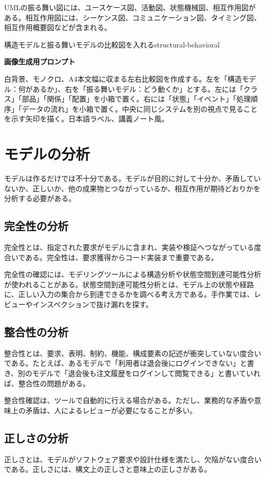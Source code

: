 \documentclass[a4paper,11pt]{ltjsarticle}
\newcommand{\prompt}[1]{\par\noindent\textbf{画像生成用プロンプト}\par\small #1\normalsize}
\begin{document}
UMLの振る舞い図には、ユースケース図、活動図、状態機械図、相互作用図がある。相互作用図には、シーケンス図、コミュニケーション図、タイミング図、相互作用概要図などが含まれる。

\begin{todobox}{構造モデルと振る舞いモデルの比較図を入れる}{structural-behavioral}
\prompt{白背景、モノクロ、A4本文幅に収まる左右比較図を作成する。左を「構造モデル：何があるか」、右を「振る舞いモデル：どう動くか」とする。左には「クラス」「部品」「関係」「配置」を小箱で置く。右には「状態」「イベント」「処理順序」「データの流れ」を小箱で置く。中央に同じシステムを別の視点で見ることを示す矢印を描く。日本語ラベル、講義ノート風。}
\end{todobox}

\section{モデルの分析}
モデルは作るだけでは不十分である。モデルが目的に対して十分か、矛盾していないか、正しいか、他の成果物とつながっているか、相互作用が期待どおりかを分析する必要がある。

\subsection{完全性の分析}
完全性とは、指定された要求がモデルに含まれ、実装や検証へつながっている度合いである。完全性は、要求獲得からコード実装まで重要である。

完全性の確認には、モデリングツールによる構造分析や状態空間到達可能性分析が使われることがある。状態空間到達可能性分析とは、モデル上の状態や経路に、正しい入力の集合から到達できるかを調べる考え方である。手作業では、レビューやインスペクションで抜け漏れを探す。

\subsection{整合性の分析}
整合性とは、要求、表明、制約、機能、構成要素の記述が衝突していない度合いである。たとえば、あるモデルで「利用者は退会後にログインできない」と書き、別のモデルで「退会後も注文履歴をログインして閲覧できる」と書いていれば、整合性の問題がある。

整合性確認は、ツールで自動的に行える場合がある。ただし、業務的な矛盾や意味上の矛盾は、人によるレビューが必要になることが多い。

\subsection{正しさの分析}
正しさとは、モデルがソフトウェア要求や設計仕様を満たし、欠陥がない度合いである。正しさには、構文上の正しさと意味上の正しさがある。
\end{document}
